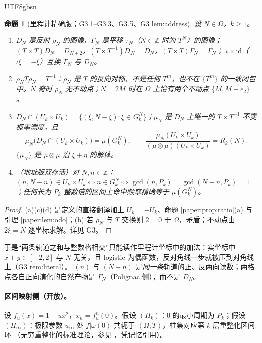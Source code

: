 \documentclass[11pt,a4paper]{article}
\newcommand{\Haar}{\mu}
\newcommand{\status}[1]{\par\noindent\fbox{\textbf{状态：#1}}\par\smallskip}
\newcommand{\Om}{\Omega}               %
\newcommand{\uinf}{u_{\infty}}
\theoremstyle{plain}
\newtheorem{prop}{命题}
\theoremstyle{definition}
\begin{document}
\begin{CJK}{UTF8}{gbsn}
\begin{prop}[里程计精确版；G3.1--G3.3、G3.5、G3 lem:address]\label{paper:prop:cml}
设 $N\in\Om$，$k\ge1$。
\begin{enumerate}[label=(\alph*)]
\item $D_N$ 是反射 $\rho_N$ 的图像，$\Gamma_N$ 是平移 $\tau_N$（$N\in\mathbb Z$ 时为 $T^N$）的图像；$(T\times T)D_N=D_{N+2}$，$(T\times T^{-1})D_N=D_N$，$(T\times T)\Gamma_N=\Gamma_N$；
$\iota\times\mathrm{id}$（$\iota\xi=-\xi$）互换 $\Gamma_N$ 与 $D_N$。
\item $\rho_NT\rho_N=T^{-1}$：$\rho_N$ 是 $T$ 的反向对称，不是任何 $T^m$，也不在 $\{T^m\}$ 的一致闭包中。$N$ 奇时 $\rho_N$ 无不动点；$N=2M$ 时在 $\Om$ 上恰有两个不动点 $\{M,M+e_2\}$。
\item $D_N\cap(U_k\times U_k)=\{(\xi,N-\xi):\xi\in G_k^N\}$；$\Haar_N$ 是 $D_N$ 上唯一的 $T\times T^{-1}$ 不变概率测度，且
\[
\Haar_N\bigl(D_N\cap(U_k\times U_k)\bigr)=\Haar(G_k^N),\qquad
\frac{\Haar_N(U_k\times U_k)}{(\Haar\otimes\Haar)(U_k\times U_k)}=R_k(N).
\]
$\{\Haar_N\}$ 是 $\Haar\otimes\Haar$ 沿 $\xi+\eta$ 的解体。
\item（地址版双存活）对 $N,n\in\mathbb Z$：$(n,N-n)\in U_k\times U_k\iff n\in G_k^N\iff\gcd(n,P_k)=\gcd(N-n,P_k)=1$；任何长为 $P_k$ 整数倍的区间上命中频率精确等于 $\Haar(G_k^N)$。
\end{enumerate}
\end{prop}
\status{已证（里程计层，无条件）}
\begin{proof}
(a)(c)(d) 是定义的直接翻译加上 $U_k=-U_k$、命题 \ref{paper:prop:ratio}(a) 与引理 \ref{paper:lem:odo}；(b) 若 $\rho_N$ 与 $T$ 交换则 $2=0$ 于 $\Om$，矛盾；不动点由 $2\xi=N$ 逐坐标求解。详见 G3。
\end{proof}

\noindent 于是“两条轨道之和与整数格相交”只能读作里程计坐标中的加法：实坐标中 $x+y\in[-2,2]$ 与 $N$ 无关，且 logistic 为偶函数，反对角线一步就被压到对角线上（G3 rem:literal）。
$(n)$ 与 $(N-n)$ 是\emph{同一条}轨道的正、反两向读数；两格点各自正向演化的自然产物是 $\Gamma_N$（Polignac 侧），而不是 $D_N$。

\paragraph{区间映射侧（开放）。}
设 $f_u(x)=1-ux^2$，$x_n=f_u^n(0)$。假设 $(H_k)$：$0$ 的最小周期为 $P_k$；假设 $(H_\infty)$：极限参数 $\uinf$ 处 $f|\omega(0)$ 共轭于 $(\Om,T)$，柱集对应第 $k$ 层重整化区间环
（无穷重整化的标准理论，参见 \cite{dMvS93}，凭记忆引用）。


\end{CJK}
\end{document}
